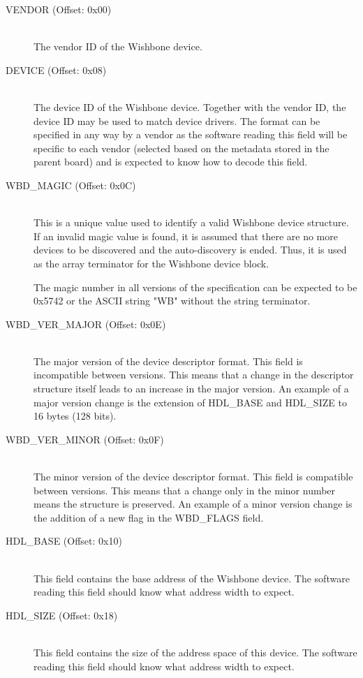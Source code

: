 \documentclass{article}
\begin{document}
\begin{description}
\item[VENDOR (Offset: 0x00)] \hfill \\
The vendor ID of the Wishbone device.

\item[DEVICE (Offset: 0x08)] \hfill \\
The device ID of the Wishbone device. Together with the vendor ID, the
device ID may be used to match device drivers. The format can be specified
in any way by a vendor as the software reading this field will be
specific to each vendor (selected based on the metadata stored in the
parent board) and is expected to know how to decode this field.

\item[WBD\_MAGIC (Offset: 0x0C)] \hfill \\
This is a unique value used to identify a valid Wishbone device structure. If
an invalid magic value is found, it is assumed that there are no more devices
to be discovered and the auto-discovery is ended. Thus, it is used as the array
terminator for the Wishbone device block.

The magic number in all versions of the specification can be expected to
be 0x5742 or the ASCII string "WB" without the string terminator.

\item[WBD\_VER\_MAJOR (Offset: 0x0E)] \hfill \\
The major version of the device descriptor format. This field is incompatible
between versions. This means that a change in the descriptor structure itself
leads to an increase in the major version. An example of a major version change
is the extension of HDL\_BASE and HDL\_SIZE to 16 bytes (128 bits).

\item[WBD\_VER\_MINOR (Offset: 0x0F)] \hfill \\
The minor version of the device descriptor format. This field is compatible
between versions. This means that a change only in the minor number means the
structure is preserved. An example of a minor version change is the addition
of a new flag in the WBD\_FLAGS field.

\item[HDL\_BASE (Offset: 0x10)] \hfill \\
This field contains the base address of the Wishbone device.
The software reading this field should know what address width to expect.

\item[HDL\_SIZE (Offset: 0x18)] \hfill \\
This field contains the size of the address space of this device.
The software reading this field should know what address width to expect.


\end{description}
\end{document}
